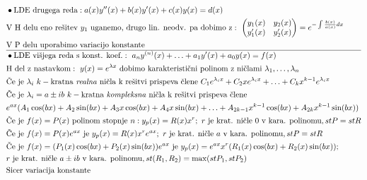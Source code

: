 \documentclass[a4paper, 8pt]{article}
\begin{document}
\begin{align*}
		& \bullet\text{LDE drugega reda}: a(x)y''(x) + b(x)y'(x) + c(x)y(x) = d(x)\\
		& \text{V H delu eno rešitev}~y_1~\text{uganemo, drugo lin. neodv. pa dobimo z}:~ \begin{pmatrix}
			y_1(x) & y_2(x) \\
			y'_1(x) & y'_2(x)
		\end{pmatrix} = e^{-\int\frac{b(x)}{a(x)}dx}\\
		& \text{V P delu uporabimo variacijo konstante}\\ \hline
		& \bullet\text{LDE višjega reda s konst. koef.}:~a_ny^{(n)}(x) + \ldots + a_1y'(x) + a_0y(x) = f(x)\\
		& \text{H del z nastavkom}:~ y(x) = e^{\lambda x}~\text{dobimo karakteristični polinom z ničlami}~\lambda_1, \ldots, \lambda_n\\
		& \text{Če je}~\lambda_i~k-\text{kratna \emph{realna} ničla k rešitvi prispeva člene}~ C_1e^{\lambda_i x} + C_2xe^{\lambda_i x} + \ldots + C_kx^{k-1}e^{\lambda_i x} \\
		& \text{Če je}~\lambda_i = a\pm ib~k-\text{kratna \emph{kompleksna} ničla k rešitvi prispeva člene} \\ 
		&e^{ax}(A_1\cos(bx) + A_2\sin(bx) + A_3x\cos(bx) + A_4x\sin(bx) + \ldots + A_{2k-1}x^{k-1}\cos(bx)+ A_{2k}x^{k-1}\sin(bx)) \\
		& \text{Če je}~f(x)=P(x)~\text{polinom stopnje}~n: y_p(x) = R(x)x^r;~r~\text{je krat. ničle}~0~\text{v kara. polinomu}, stP = stR\\
		& \text{Če je}~f(x)=P(x)e^{ax}~\text{je}~y_p(x) = R(x)x^re^{ax};~r~\text{je krat. ničle}~a~\text{v kara. polinomu}, stP = stR\\
		& \text{Če je}~f(x)=(P_1(x)\cos(bx) + P_2(x)\sin(bx))e^{ax}~\text{je}~y_p(x) = e^{ax}x^r(R_1(x)\cos(bx) + R_2(x)\sin(bx)); \\
		&r~\text{je krat. ničle}~a\pm ib~\text{v kara. polinomu}, st(R_1, R_2) = \max(stP_1, stP_2)\\
		& \text{Sicer variacija konstante}\\
	\end{align*}
\end{document}
